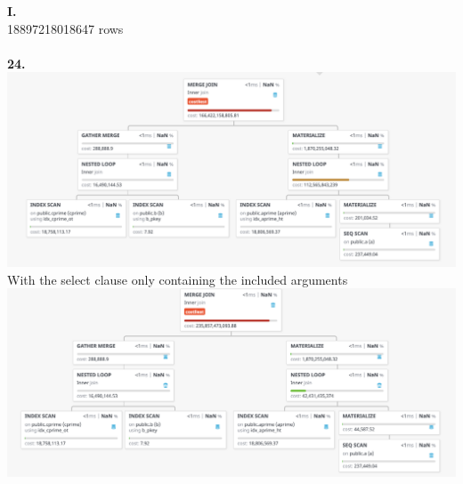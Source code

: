 \documentclass[12pt, letterpaper, fleqn]{article}
\begin{document}
  \textbf{I. }\\
  	18897218018647 rows\\\\


  \textbf{24. }\\
  \includegraphics[scale=0.4]{query_pics/24.png} \\
  With the select clause only containing the included arguments\\
  \includegraphics[scale=0.4]{query_pics/24b.png} \\\\
\end{document}
